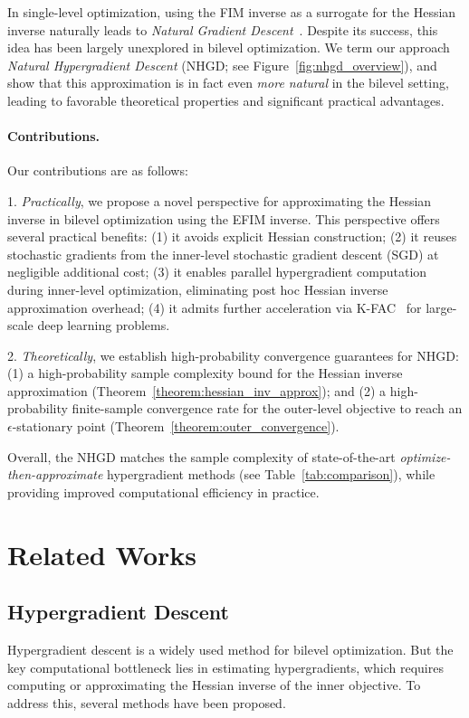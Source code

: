 \documentclass[11 pt]{article}
\begin{document}
In single-level optimization, using the FIM inverse as a surrogate for the Hessian inverse naturally leads to \emph{Natural Gradient Descent}~\cite{amari1998natural}. 
Despite its success, this idea has been largely unexplored in bilevel optimization. 
We term our approach \emph{Natural Hypergradient Descent} (NHGD; see Figure~\ref{fig:nhgd_overview}), and show that this approximation is in fact even \emph{more natural} in the bilevel setting, leading to favorable theoretical properties and significant practical advantages.

\paragraph{Contributions.}
Our contributions are as follows: 

1. \textit{Practically}, we propose a novel perspective for approximating the Hessian inverse in bilevel optimization using the EFIM inverse. 
This perspective offers several practical benefits:
    (1) it avoids explicit Hessian construction; 
    (2) it reuses stochastic gradients from the inner-level stochastic gradient descent (SGD) at negligible additional cost;
    (3) it enables parallel hypergradient computation during inner-level optimization, eliminating post hoc Hessian inverse approximation overhead;
    (4) it admits further acceleration via K-FAC~\cite{martens2015optimizing} for large-scale deep learning problems.  
    
2.\textit{ Theoretically}, we establish high-probability convergence guarantees for NHGD: 
    (1) a high-probability sample complexity bound for the Hessian inverse approximation (Theorem~\ref{theorem:hessian_inv_approx}); and  
    (2) a high-probability finite-sample convergence rate for the outer-level objective to reach an $\epsilon$-stationary point (Theorem~\ref{theorem:outer_convergence}).

Overall, the NHGD matches the sample complexity of state-of-the-art \emph{optimize-then-approximate} hypergradient methods (see Table~\ref{tab:comparison}), while providing improved computational efficiency in practice. 





\section{Related Works}

\subsection{Hypergradient Descent}
Hypergradient descent is a widely used method for bilevel optimization. But the key computational bottleneck lies in estimating hypergradients, which requires computing or approximating the Hessian inverse of the inner objective. To address this, several methods have been proposed.
\end{document}
